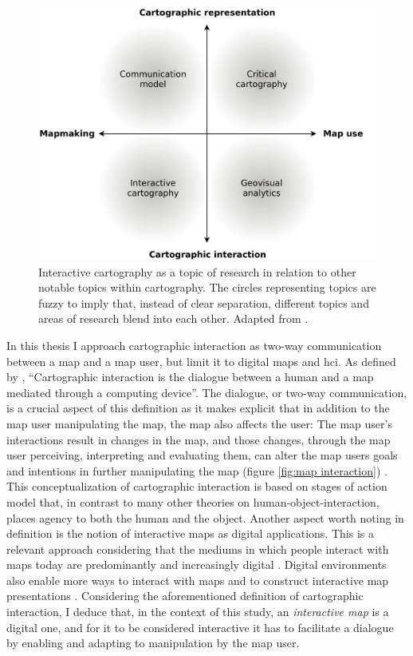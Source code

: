 \begin{figure}[H]
	\centering
	\includegraphics[width=\diagramwidth]{visual/figures/diagrams/cartography_topics.png}
	\caption{
		Interactive cartography as a topic of research
		in relation to other notable topics within cartography.
		The circles representing topics are fuzzy to imply that,
		instead of clear separation,
		different topics and areas of research blend into each other.
		Adapted from \textcite{rot2013b}.
	}
	\label{fig:cartography topics}
\end{figure}


In this thesis I approach cartographic interaction as
two-way communication between a map and a map user,
but limit it to digital maps and \acrshort{hci}.
As defined by \textcite[p.~14]{rot2011},
\enquote{Cartographic interaction is the dialogue between a human and a map
mediated through a computing device}.
The dialogue, or two-way communication, is a crucial aspect of this definition
as it makes explicit that in addition to the map user manipulating the map,
the map also affects the user:
The map user's interactions result in changes in the map,
and those changes, through the map user perceiving, interpreting and evaluating them,
can alter the map users goals and intentions
in further manipulating the map (figure \ref{fig:map interaction}) \parencite{rot2012}.
This conceptualization of cartographic interaction
is based on 
stages of action model that,
in contrast to many other theories on human-object-interaction,
places agency to both the human and the object.
Another aspect worth noting in  definition
is the notion of interactive maps as digital applications.
This is a relevant approach considering
that the mediums in which people interact with maps today
are predominantly and increasingly digital \parencite{mei2019}.
Digital environments also enable more ways to interact with maps
and to construct interactive map presentations \parencite{rot2013b, mei2019}.
Considering the aforementioned definition of cartographic interaction,
I deduce that, in the context of this study,
an \textit{interactive map} is a digital one,
and for it to be considered interactive it has to
facilitate a dialogue by enabling and adapting to manipulation by the map user.

